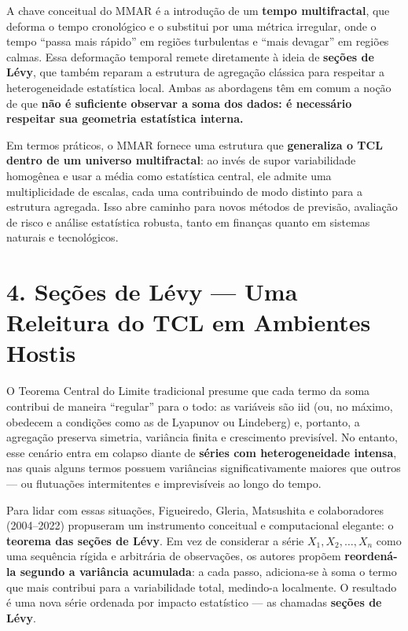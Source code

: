 \documentclass[
  portuguese,
]{agujournal2019}
\begin{document}
A chave conceitual do MMAR é a introdução de um \textbf{tempo
multifractal}, que deforma o tempo cronológico e o substitui por uma
métrica irregular, onde o tempo ``passa mais rápido'' em regiões
turbulentas e ``mais devagar'' em regiões calmas. Essa deformação
temporal remete diretamente à ideia de \textbf{seções de Lévy}, que
também reparam a estrutura de agregação clássica para respeitar a
heterogeneidade estatística local. Ambas as abordagens têm em comum a
noção de que \textbf{não é suficiente observar a soma dos dados: é
necessário respeitar sua geometria estatística interna.}

Em termos práticos, o MMAR fornece uma estrutura que \textbf{generaliza
o TCL dentro de um universo multifractal}: ao invés de supor
variabilidade homogênea e usar a média como estatística central, ele
admite uma multiplicidade de escalas, cada uma contribuindo de modo
distinto para a estrutura agregada. Isso abre caminho para novos métodos
de previsão, avaliação de risco e análise estatística robusta, tanto em
finanças quanto em sistemas naturais e tecnológicos.

\section{4. Seções de Lévy --- Uma Releitura do TCL em Ambientes
Hostis}\label{seuxe7uxf5es-de-luxe9vy-uma-releitura-do-tcl-em-ambientes-hostis}

O Teorema Central do Limite tradicional presume que cada termo da soma
contribui de maneira ``regular'' para o todo: as variáveis são iid (ou,
no máximo, obedecem a condições como as de Lyapunov ou Lindeberg) e,
portanto, a agregação preserva simetria, variância finita e crescimento
previsível. No entanto, esse cenário entra em colapso diante de
\textbf{séries com heterogeneidade intensa}, nas quais alguns termos
possuem variâncias significativamente maiores que outros --- ou
flutuações intermitentes e imprevisíveis ao longo do tempo.

Para lidar com essas situações, Figueiredo, Gleria, Matsushita e
colaboradores (2004--2022) propuseram um instrumento conceitual e
computacional elegante: o \textbf{teorema das seções de Lévy}. Em vez de
considerar a série \(X_1, X_2, \dots, X_n\) como uma sequência rígida e
arbitrária de observações, os autores propõem \textbf{reordená-la
segundo a variância acumulada}: a cada passo, adiciona-se à soma o termo
que mais contribui para a variabilidade total, medindo-a localmente. O
resultado é uma nova série ordenada por impacto estatístico --- as
chamadas \textbf{seções de Lévy}.
\end{document}
